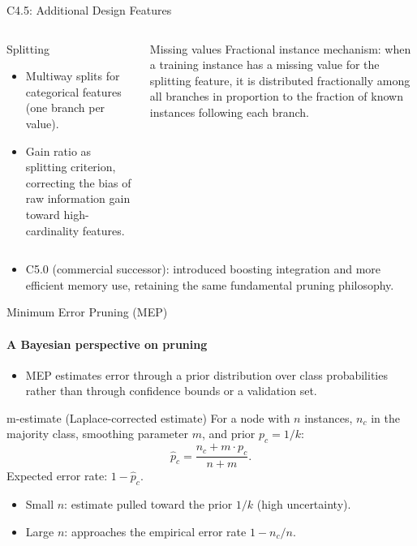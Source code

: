 \begin{frame}{C4.5: Additional Design Features}
  \begin{columns}[t]
      \begin{block}{Splitting}
        \begin{itemize}
          \item \alert{Multiway splits} for categorical features (one branch per value).
          \item \alert{Gain ratio} as splitting criterion, correcting the bias of raw information
                gain toward high-cardinality features.
        \end{itemize}
      \end{block}
      \begin{block}{Missing values}
        \alert{Fractional instance mechanism}: when a training instance has a missing value for
        the splitting feature, it is distributed fractionally among all branches in proportion
        to the fraction of known instances following each branch.
      \end{block}
  \end{columns}
  \vspace{0.4em}
  \begin{itemize}
    \item \alert{C5.0} (commercial successor): introduced boosting integration and more efficient
          memory use, retaining the same fundamental pruning philosophy.
  \end{itemize}
\end{frame}

\begin{frame}{Minimum Error Pruning (MEP)}
  \framesubtitle{A Bayesian perspective on pruning}
  \begin{itemize}
    \item MEP estimates error through a \alert{prior distribution} over class probabilities rather
          than through confidence bounds or a validation set.
  \end{itemize}
  \begin{block}{m-estimate (Laplace-corrected estimate)}
    For a node with $n$ instances, $n_c$ in the majority class, smoothing parameter $m$,
    and prior $p_c = 1/k$:
    \[
      \hat{p}_c = \frac{n_c + m \cdot p_c}{n + m}.
    \]
    Expected error rate: $1 - \hat{p}_c$.
    \begin{itemize}
      \item Small $n$: estimate pulled toward the prior $1/k$ (high uncertainty).
      \item Large $n$: approaches the empirical error rate $1 - n_c/n$.
    \end{itemize}
  \end{block}
\end{frame}

